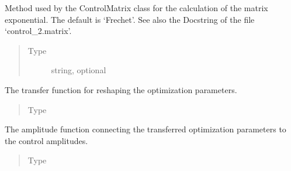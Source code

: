 \documentclass[letterpaper,10pt,english]{sphinxmanual}
\begin{document}
\begin{fulllineitems}
\begin{fulllineitems}
\begin{quote}
\begin{description}
\end{description}\end{quote}

\end{fulllineitems}


\begin{fulllineitems}
\label{\detokenize{qsim:qsim.solver_algorithms.Solver.exponential_method}}
Method used by the ControlMatrix class for the calculation of the
matrix exponential. The default is ‘Frechet’. See also the Docstring of
the file ‘control\_2.matrix’.
\begin{quote}\begin{description}
\item[{Type}] \leavevmode
string, optional

\end{description}\end{quote}

\end{fulllineitems}


\begin{fulllineitems}
\label{\detokenize{qsim:qsim.solver_algorithms.Solver.transfer_function}}
The transfer function for reshaping the optimization parameters.
\begin{quote}\begin{description}
\item[{Type}] \leavevmode
{\hyperref[\detokenize{qsim:qsim.transfer_function.TransferFunction}]{}}

\end{description}\end{quote}

\end{fulllineitems}


\begin{fulllineitems}
\label{\detokenize{qsim:qsim.solver_algorithms.Solver.amplitude_function}}
The amplitude function connecting the transferred optimization
parameters to the control amplitudes.
\begin{quote}\begin{description}
\item[{Type}] \leavevmode
{\hyperref[\detokenize{qsim:qsim.amplitude_functions.AmplitudeFunction}]{}}


\end{description}
\end{quote}
\end{fulllineitems}
\end{fulllineitems}
\end{document}
